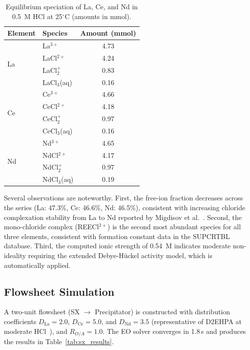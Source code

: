 \documentclass[11pt]{article}
\begin{document}
\begin{table}[t]
  \centering
  \caption{Equilibrium speciation of La, Ce, and Nd in 0.5~M HCl
    at 25$^\circ$C (amounts in mmol).}
  \label{tab:speciation}
  \begin{tabular}{@{}llc@{}}
    \toprule
    Element & Species & Amount (mmol) \\
    \midrule
    \multirow{4}{*}{La}
      & La$^{3+}$       & 4.73 \\
      & LaCl$^{2+}$     & 4.24 \\
      & LaCl$_2^+$      & 0.83 \\
      & LaCl$_3$(aq)    & 0.16 \\
    \midrule
    \multirow{4}{*}{Ce}
      & Ce$^{3+}$       & 4.66 \\
      & CeCl$^{2+}$     & 4.18 \\
      & CeCl$_2^+$      & 0.97 \\
      & CeCl$_3$(aq)    & 0.16 \\
    \midrule
    \multirow{4}{*}{Nd}
      & Nd$^{3+}$       & 4.65 \\
      & NdCl$^{2+}$     & 4.17 \\
      & NdCl$_2^+$      & 0.97 \\
      & NdCl$_3$(aq)    & 0.19 \\
    \bottomrule
  \end{tabular}
\end{table}

Several observations are noteworthy.  First, the free-ion fraction
decreases across the series (La: 47.3\%, Ce: 46.6\%, Nd: 46.5\%),
consistent with increasing chloride complexation stability from La to
Nd reported by Migdisov et al.~\citep{migdisov2009experimental}.  Second,
the mono-chloride complex (REECl$^{2+}$) is the second most abundant
species for all three elements, consistent with formation constant data
in the SUPCRTBL database.  Third, the computed ionic strength of 0.54~M
indicates moderate non-ideality requiring the extended Debye-H\"uckel
activity model, which is automatically applied.

\subsection{Flowsheet Simulation}

A two-unit flowsheet (SX $\rightarrow$ Precipitator) is constructed
with distribution coefficients $D_{\text{La}} = 2.0$,
$D_{\text{Ce}} = 5.0$, and $D_{\text{Nd}} = 3.5$ (representative
of D2EHPA at moderate HCl~\citep{xie2014critical}), and
$R_{O/A} = 1.0$.  The EO solver converges in 1.8\,s and produces
the results in Table~\ref{tab:sx_results}.
\end{document}
